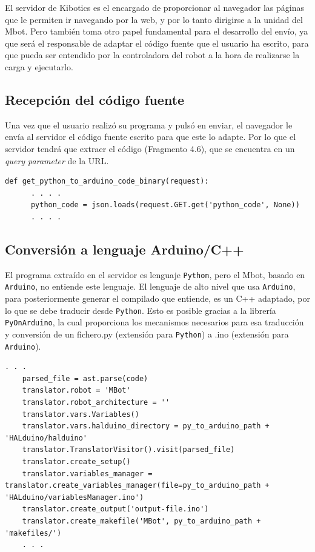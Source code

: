\documentclass{report}
\begin{document}
El servidor de Kibotics es el encargado de proporcionar al navegador las páginas que le permiten ir navegando por la web, y por lo tanto dirigirse a la unidad del Mbot. Pero también toma otro papel fundamental para el desarrollo del envío, ya que será el responsable de adaptar el código fuente que el usuario ha escrito, para que pueda ser entendido por la controladora del robot a la hora de realizarse la carga y ejecutarlo.

\subsection{Recepción del código fuente}

Una vez que el usuario realizó su programa y pulsó en enviar, el navegador le envía al servidor el código fuente escrito para que este lo adapte. Por lo que el servidor tendrá que extraer el código (Fragmento 4.6), que se encuentra en un \textit{query parameter} de la URL.
\\
\begin{lstlisting}[frame=single,breaklines=true, label=Extracción del programa en el servidor, caption=Extracción programa en el servidor, captionpos=b]
   def get_python_to_arduino_code_binary(request):
      . . . .
      python_code = json.loads(request.GET.get('python_code', None))
      . . . .

\end{lstlisting}

\subsection{Conversión a lenguaje Arduino/C++}

El programa extraído en el servidor es lenguaje \texttt{Python}, pero el Mbot, basado en \texttt{Arduino}, no entiende este lenguaje. El lenguaje de alto nivel que usa \texttt{Arduino}, para posteriormente generar el compilado que entiende, es un C++ adaptado, por lo que se debe traducir desde \texttt{Python}. Esto es posible gracias a la librería \texttt{PyOnArduino}, la cual proporciona los mecanismos necesarios para esa traducción y conversión de un fichero.py (extensión para \texttt{Python}) a .ino (extensión para \texttt{Arduino}).
\\
\begin{lstlisting}[frame=single,breaklines=true, label=Traducción de lenguaje Python a Arduino, caption=Traducción de lenguaje Python a Arduino, captionpos=b]
   . . .    
    parsed_file = ast.parse(code)
    translator.robot = 'MBot'
    translator.robot_architecture = ''
    translator.vars.Variables()
    translator.vars.halduino_directory = py_to_arduino_path + 'HALduino/halduino'
    translator.TranslatorVisitor().visit(parsed_file)
    translator.create_setup()
    translator.variables_manager = translator.create_variables_manager(file=py_to_arduino_path + 'HALduino/variablesManager.ino')
    translator.create_output('output-file.ino')
    translator.create_makefile('MBot', py_to_arduino_path + 'makefiles/')
    . . .


\end{lstlisting}
\end{document}
